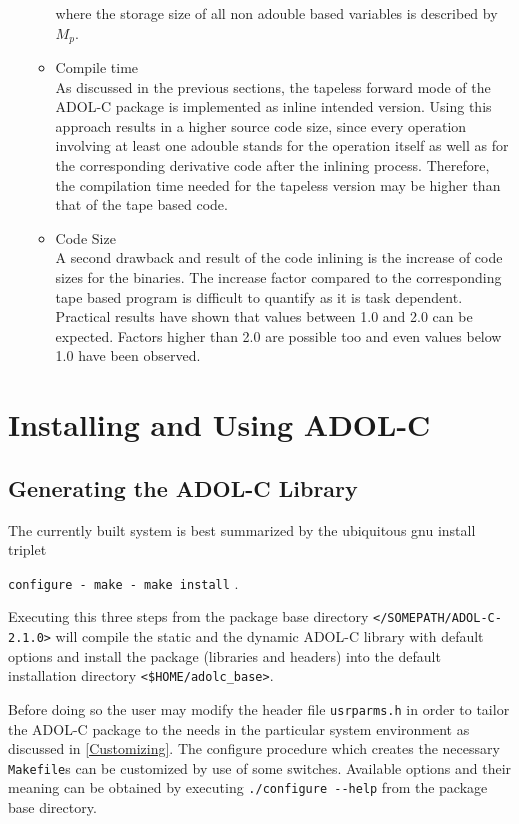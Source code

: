 \documentclass[11pt,twoside]{article}
\begin{document}
\begin{itemize}
\begin{itemize}
      where the storage size of all non {\sf adouble} based variables is described by $M_p$.
    \item Compile time\\
      As discussed in the previous sections, the tapeless forward mode of
      the ADOL-C package is implemented as inline intended version. Using
      this approach results in a higher source code size, since every
      operation involving at least one {\sf adouble} stands for the
      operation itself as well as for the corresponding derivative
      code after the inlining process. Therefore, the compilation time
      needed for the tapeless version may be higher than that of the tape based code. 
    \item Code Size\\
      A second drawback and result of the code inlining is the
      increase of code sizes for the binaries. The increase
      factor compared to the corresponding tape based program is
      difficult to quantify as it is task dependent. Practical results
      have shown that values between 1.0 and 2.0 can be
      expected. Factors higher than 2.0 are possible too and even
      values below 1.0 have been observed. 
    \end{itemize}
\end{itemize}
%
\section{Installing and Using ADOL-C}
\label{install}
%
\subsection{Generating the ADOL-C Library}
\label{genlib}
%
The currently built system is best summarized by the ubiquitous gnu
install triplet 
\begin{center}
\verb=configure - make - make install= .
\end{center}
Executing this three steps from the package base directory
\verb=</SOMEPATH/ADOL-C-2.1.0>= will compile the static and the dynamic
ADOL-C library with default options and install the package (libraries
and headers) into the default installation directory {\tt \verb=<=\$HOME/adolc\_base\verb=>=}.

Before doing so the user may modify the header file \verb=usrparms.h=
in order to tailor the \mbox{ADOL-C} package to the needs in the
particular system environment as discussed in 
\autoref{Customizing}. The configure procedure which creates the necessary
\verb=Makefile=s can be customized by use of some switches. Available
options and their meaning can be obtained by executing
\verb=./configure --help= from the package base directory. 
\end{document}
